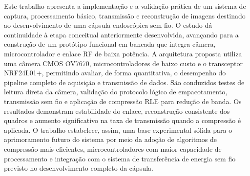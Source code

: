 \documentclass[repeatfields,xlists,xpacks,oneside]{ufrgscca}
\begin{document}


%


\begin{mainabstract}

Este trabalho apresenta a implementação e a validação prática de um sistema de captura, processamento básico, transmissão e reconstrução de imagens destinado ao desenvolvimento de uma cápsula endoscópica sem fio. O estudo dá continuidade à etapa conceitual anteriormente desenvolvida, avançando para a construção de um protótipo funcional em bancada que integra câmera, microcontrolador e enlace RF de baixa potência. A arquitetura proposta utiliza uma câmera CMOS OV7670, microcontroladores de baixo custo e o transceptor NRF24L01+, permitindo avaliar, de forma quantitativa, o desempenho do pipeline completo de aquisição e transmissão de dados. São conduzidos testes de leitura direta da câmera, validação do protocolo lógico de empacotamento, transmissão sem fio e aplicação de compressão RLE para redução de banda. Os resultados demonstram estabilidade do enlace, reconstrução consistente dos quadros e aumento significativo na taxa de transmissão quando a compressão é aplicada. O trabalho estabelece, assim, uma base experimental sólida para o aprimoramento futuro do sistema por meio da adoção de algoritmos de compressão mais eficientes, microcontroladores com maior capacidade de processamento e integração com o sistema de transferência de energia sem fio previsto no desenvolvimento completo da cápsula.

\end{mainabstract}

\end{document}

